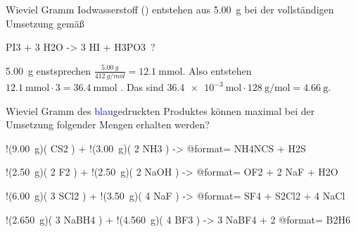 \documentclass[DIV11,bib=totoc]{scrartcl}
\begin{document}
\begin{question}
Wieviel Gramm Iodwasserstoff () entstehen aus \SI{5.00}{g}  bei
der vollständigen Umsetzung gemäß
\begin{reaction*}
  PI3 + 3 H2O -> 3 HI + H3PO3 \,?
\end{reaction*}
\end{question}
\begin{solution}
\SI{5.00}{g}  enstsprechen $\frac{\SI{5.00}{g}}{\SI{412}{g/mol}} =
\SI{12.1}{\milli\mole}$.  Also entstehen $\SI{12.1}{\milli\mole}\cdot3 =
\SI{36.4}{\milli\mole}$ .  Das sind
$\SI{36.4e-3}{\mole}\cdot\SI{128}{\gram\per\mole} = \SI{4.66}{\gram}$.
\end{solution}

\begin{question}
Wieviel Gramm des \textcolor{blue}{blau}gedruckten Produktes können maximal bei
der Umsetzung folgender Mengen erhalten werden?
\begin{tasks}
 \task
   \begin{reaction*}
     !(\SI{9.00}{\gram})( CS2 ) + !(\SI{3.00}{\gram})( 2 NH3 ) ->
       @{format=\color{blue}} NH4NCS + H2S
    \end{reaction*}
 \task
   \begin{reaction*}
     !(\SI{2.50}{\gram})( 2 F2 ) + !(\SI{2.50}{\gram})( 2 NaOH ) ->
       @{format=\color{blue}} OF2 + 2 NaF + H2O
    \end{reaction*}
 \task
   \begin{reaction*}
     !(\SI{6.00}{\gram})( 3 SCl2 ) + !(\SI{3.50}{\gram})( 4 NaF ) ->
       @{format=\color{blue}} SF4 + S2Cl2 + 4 NaCl
    \end{reaction*}
 \task
   \begin{reaction*}
     !(\SI{2.650}{\gram})( 3 NaBH4 ) + !(\SI{4.560}{\gram})( 4 BF3 ) ->
       3 NaBF4 + 2 @{format=\color{blue}} B2H6
    \end{reaction*}
\end{tasks}
\end{question}
\end{document}
